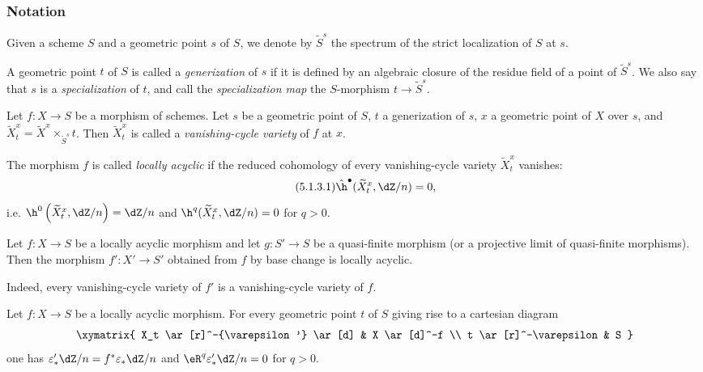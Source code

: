 \documentclass[oneside]{book}
\begin{document}
\subsubsection{Notation}\label{I:5-1-1}

Given a scheme $S$ and a geometric point $s$ of $S$, we denote by
$\widetilde S^s$ the spectrum of the strict localization of $S$ at $s$.

\begin{definition}\label{I:5-1-2}
A geometric point $t$ of $S$ is called a \emph{generization} of $s$ if
it is defined by an algebraic closure of the residue field of a point of
$\widetilde S^s$. We also say that $s$ is a \emph{specialization} of
$t$, and call the \emph{specialization map} the $S$-morphism
$t\to\widetilde S^s$.
\end{definition}

\begin{definition}\label{I:5-1-3}
Let $f:X\to S$ be a morphism of schemes. Let $s$ be a geometric point
of $S$, $t$ a generization of $s$, $x$ a geometric point of $X$ over
$s$, and
$\widetilde X_t^x=\widetilde X^x\times_{\widetilde S^s}t$. Then
$\widetilde X_t^x$ is called a \emph{vanishing-cycle variety} of $f$ at
$x$.

The morphism $f$ is called \emph{locally acyclic} if the reduced
cohomology of every vanishing-cycle variety $\widetilde X_t^x$ vanishes:
\begin{equation*}\tag{5.1.3.1}\label{I:eq:5-1-3-1}
  \hat\h^\bullet(\widetilde X_t^x,\dZ/n) = 0\text{,}
\end{equation*}
i.e. $\h^0\left(\widetilde X_t^x,\dZ/n\right)=\dZ/n$ and
$\h^q(\widetilde X_t^x,\dZ/n)=0$ for $q>0$.
\end{definition}

\begin{lemma}\label{I:5-1-4}
Let $f:X\to S$ be a locally acyclic morphism and let $g:S'\to S$ be a
quasi-finite morphism (or a projective limit of quasi-finite morphisms).
Then the morphism $f':X'\to S'$ obtained from $f$ by base change is
locally acyclic.
\end{lemma}

Indeed, every vanishing-cycle variety of $f'$ is a vanishing-cycle
variety of $f$.

\begin{lemma}\label{I:5-1-5}
Let $f:X\to S$ be a locally acyclic morphism. For every geometric point
$t$ of $S$ giving rise to a cartesian diagram
\[\xymatrix{
  X_t \ar[r]^-{\varepsilon'} \ar[d]
    & X \ar[d]^-f \\
  t \ar[r]^-\varepsilon
    & S
}\]
one has $\varepsilon_*'\dZ/n=f^*\varepsilon_*\dZ/n$ and
$\eR^q\varepsilon_*'\dZ/n=0$ for $q>0$.
\end{lemma}
\end{document}

